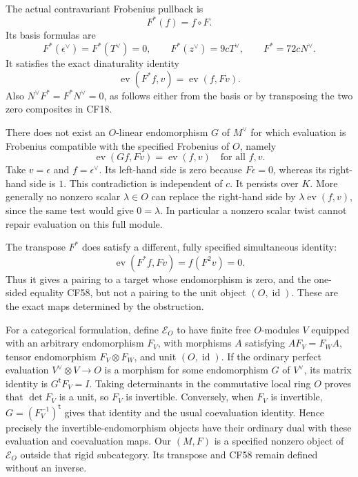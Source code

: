 \documentclass[
  10pt,
]{article}
\begin{document}
The actual contravariant Frobenius pullback is \[
 F^*(f)=f\circ F.
 \tag{CF56}
\] Its basis formulas are \[
 F^*(\epsilon^\vee)=F^*(T^\vee)=0,
 \qquad F^*(z^\vee)=9cT^\vee,
 \qquad F^*=72cN^\vee.
 \tag{CF57}
\] It satisfies the exact dinaturality identity \[
 \operatorname{ev}(F^*f,v)=\operatorname{ev}(f,Fv).
 \tag{CF58}
\] Also \(N^\vee F^*=F^*N^\vee=0\), as follows either from the basis or
by transposing the two zero composites in CF18.

There does not exist an \(O\)-linear endomorphism \(G\) of \(M^\vee\)
for which evaluation is Frobenius compatible with the specified
Frobenius of \(O\), namely \[
 \operatorname{ev}(Gf,Fv)=\operatorname{ev}(f,v)
 \quad\text{for all }f,v.
 \tag{CF59}
\] Take \(v=\epsilon\) and \(f=\epsilon^\vee\). Its left-hand side is
zero because \(F\epsilon=0\), whereas its right-hand side is \(1\). This
contradiction is independent of \(c\). It persists over \(K\). More
generally no nonzero scalar \(\lambda\in O\) can replace the right-hand
side by \(\lambda\operatorname{ev}(f,v)\), since the same test would
give \(0=\lambda\). In particular a nonzero scalar twist cannot repair
evaluation on this full module.

The transpose \(F^*\) does satisfy a different, fully specified
simultaneous identity: \[
 \operatorname{ev}(F^*f,Fv)=f(F^2v)=0.
 \tag{CF60}
\] Thus it gives a pairing to a target whose endomorphism is zero, and
the one-sided equality CF58, but not a pairing to the unit object
\((O,\operatorname{id})\). These are the exact maps determined by the
obstruction.

For a categorical formulation, define \(\mathcal E_O\) to have finite
free \(O\)-modules \(V\) equipped with an arbitrary endomorphism
\(F_V\), with morphisms \(A\) satisfying \(AF_V=F_WA\), tensor
endomorphism \(F_V\otimes F_W\), and unit \((O,\operatorname{id})\). If
the ordinary perfect evaluation \(V^\vee\otimes V\to O\) is a morphism
for some endomorphism \(G\) of \(V^\vee\), its matrix identity is
\(G^{\mathsf t}F_V=I\). Taking determinants in the commutative local
ring \(O\) proves that \(\det F_V\) is a unit, so \(F_V\) is invertible.
Conversely, when \(F_V\) is invertible, \(G=(F_V^{-1})^{\mathsf t}\)
gives that identity and the usual coevaluation identity. Hence precisely
the invertible-endomorphism objects have their ordinary dual with these
evaluation and coevaluation maps. Our \((M,F)\) is a specified nonzero
object of \(\mathcal E_O\) outside that rigid subcategory. Its transpose
and CF58 remain defined without an inverse.
\end{document}
